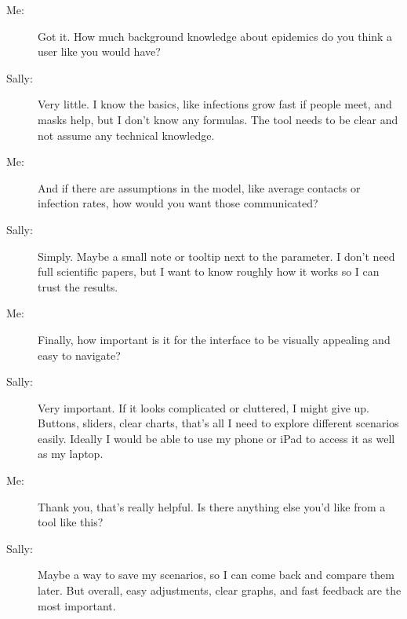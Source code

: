\begin{description}
  \item[Me:] Got it. How much background knowledge about epidemics do you think a user like you would have?
  \item[Sally:] Very little. I know the basics, like infections grow fast if people meet, and masks help, but I don’t know any formulas. The tool needs to be clear and not assume any technical knowledge.
  
  \item[Me:] And if there are assumptions in the model, like average contacts or infection rates, how would you want those communicated?
  \item[Sally:] Simply. Maybe a small note or tooltip next to the parameter. I don’t need full scientific papers, but I want to know roughly how it works so I can trust the results.
  
  \item[Me:] Finally, how important is it for the interface to be visually appealing and easy to navigate?
  \item[Sally:] Very important. If it looks complicated or cluttered, I might give up. Buttons, sliders, clear charts, that’s all I need to explore different scenarios easily. Ideally I would be able to use my phone or iPad to access it as well as my laptop.
  
  \item[Me:] Thank you, that’s really helpful. Is there anything else you’d like from a tool like this?
  \item[Sally:] Maybe a way to save my scenarios, so I can come back and compare them later. But overall, easy adjustments, clear graphs, and fast feedback are the most important.
\end{description}
